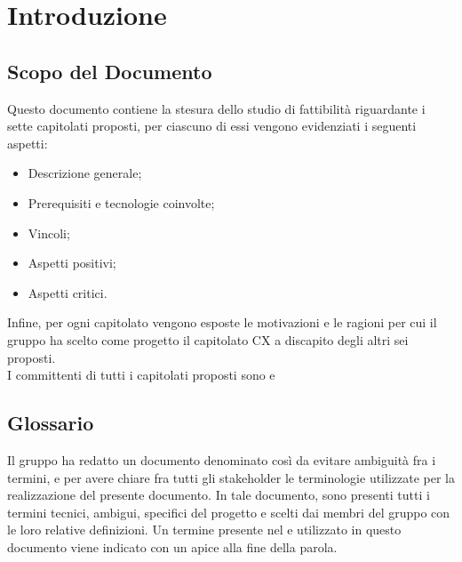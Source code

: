 \section{Introduzione}
\subsection{Scopo del Documento}
Questo documento contiene la stesura dello studio di fattibilità riguardante i sette capitolati proposti, per ciascuno di essi vengono evidenziati i seguenti aspetti:
\begin{itemize}
    \item Descrizione generale;
    \item Prerequisiti e tecnologie coinvolte;
    \item Vincoli;
    \item Aspetti positivi;
    \item Aspetti critici.
\end{itemize}
Infine, per ogni capitolato vengono esposte le motivazioni e le ragioni per cui il gruppo ha scelto come progetto il capitolato CX \NomeProgetto{} a discapito degli altri sei proposti.\\
I committenti di tutti i capitolati proposti sono \VT{} e \CR{}

\subsection{Glossario}
Il gruppo \Gruppo{} ha redatto un documento denominato  così da evitare ambiguità fra i termini, e per avere chiare fra tutti gli stakeholder le terminologie utilizzate per la realizzazione del presente documento.
In tale documento, sono presenti tutti i termini tecnici, ambigui, specifici del progetto e scelti dai membri del gruppo con le loro relative definizioni.
Un termine presente nel  e utilizzato in questo documento viene indicato con un apice  alla fine della parola.

